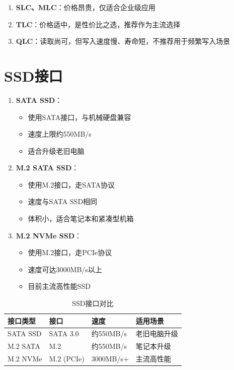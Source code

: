 \documentclass[12pt,UTF8]{ctexbook}
\begin{document}
\begin{enumerate}
    \item \textbf{SLC、MLC}：价格昂贵，仅适合企业级应用
    \item \textbf{TLC}：价格适中，是性价比之选，推荐作为主流选择
    \item \textbf{QLC}：读取尚可，但写入速度慢、寿命短，不推荐用于频繁写入场景
\end{enumerate}

\section{SSD接口}

\begin{enumerate}
    \item \textbf{SATA SSD}：
    \begin{itemize}[leftmargin=2em]
        \item 使用SATA接口，与机械硬盘兼容
        \item 速度上限约550MB/s
        \item 适合升级老旧电脑
    \end{itemize}
    
    \item \textbf{M.2 SATA SSD}：
    \begin{itemize}[leftmargin=2em]
        \item 使用M.2接口，走SATA协议
        \item 速度与SATA SSD相同
        \item 体积小，适合笔记本和紧凑型机箱
    \end{itemize}
    
    \item \textbf{M.2 NVMe SSD}：
    \begin{itemize}[leftmargin=2em]
        \item 使用M.2接口，走PCIe协议
        \item 速度可达3000MB/s以上
        \item 目前主流高性能SSD
    \end{itemize}
\end{enumerate}

\begin{table}[H]
    \centering
    \begin{tabular}{|p{4cm}|p{3cm}|p{3cm}|p{4cm}|}
        \hline
        \textbf{接口类型} & \textbf{接口} & \textbf{速度} & \textbf{适用场景} \\
        \hline
        SATA SSD & SATA 3.0 & 约550MB/s & 老旧电脑升级 \\
        \hline
        M.2 SATA & M.2 & 约550MB/s & 笔记本升级 \\
        \hline
        M.2 NVMe & M.2 (PCIe) & 3000MB/s+ & 主流高性能 \\
        \hline
    \end{tabular}
    \caption{SSD接口对比}
    \label{tab:ssd_interface}
\end{table}
\end{document}
